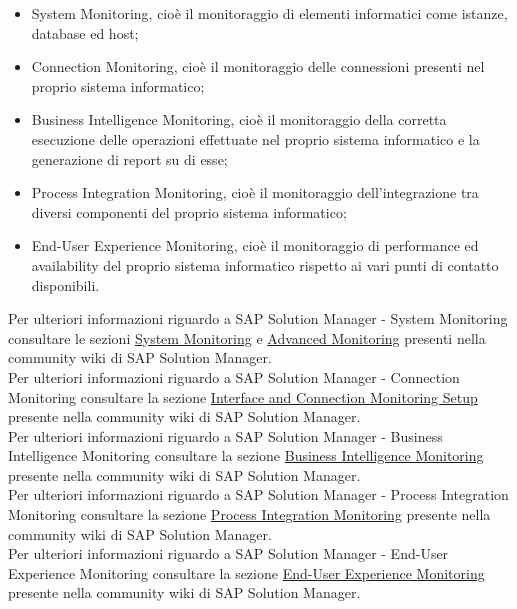 \begin{itemize}
	\item System Monitoring, cioè il monitoraggio di elementi informatici come istanze, database ed host;
    \item Connection Monitoring, cioè il monitoraggio delle connessioni presenti nel proprio sistema informatico;
    \item Business Intelligence Monitoring, cioè il monitoraggio della corretta esecuzione delle operazioni effettuate nel proprio sistema informatico e la generazione di report su di esse;
    \item Process Integration Monitoring, cioè il monitoraggio dell'integrazione tra diversi componenti del proprio sistema informatico;
    \item End-User Experience Monitoring, cioè il monitoraggio di performance ed availability del proprio sistema informatico rispetto ai vari punti di contatto disponibili.
\end{itemize}

Per ulteriori informazioni riguardo a SAP Solution Manager - System Monitoring consultare le sezioni \href{https://wiki.scn.sap.com/wiki/display/TechOps/Solution+Manager+7.2+-+System+Monitoring}{System Monitoring} e \href{https://wiki.scn.sap.com/wiki/display/TechOps/System+Monitoring+7.2+-+Advanced+Monitoring}{Advanced Monitoring} presenti nella community wiki di SAP Solution Manager.
\\
Per ulteriori informazioni riguardo a SAP Solution Manager - Connection Monitoring consultare la sezione \href{https://wiki.scn.sap.com/wiki/display/TechOps/Interface+and+Connection+Monitoring+Setup+with+SAP+Solution+Manager+7.2}{Interface and Connection Monitoring Setup} presente nella community wiki di SAP Solution Manager.
\\
Per ulteriori informazioni riguardo a SAP Solution Manager - Business Intelligence Monitoring consultare la sezione \href{https://wiki.scn.sap.com/wiki/display/SMAUTH/Technical+Monitoring+-+Business+Intelligence+Monitoring}{Business Intelligence Monitoring} presente nella community wiki di SAP Solution Manager.
\\
Per ulteriori informazioni riguardo a SAP Solution Manager - Process Integration Monitoring consultare la sezione \href{https://wiki.scn.sap.com/wiki/display/TechOps/Central+PI+Monitoring+with+SAP+Solution+Manager+7.2}{Process Integration Monitoring} presente nella community wiki di SAP Solution Manager.
\\
Per ulteriori informazioni riguardo a SAP Solution Manager - End-User Experience Monitoring consultare la sezione \href{https://wiki.scn.sap.com/wiki/display/EEM/Home}{End-User Experience Monitoring} presente nella community wiki di SAP Solution Manager.


